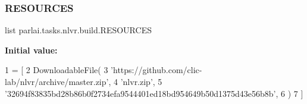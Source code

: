 \subsubsection{\texorpdfstring{R\+E\+S\+O\+U\+R\+C\+ES}{RESOURCES}}
{\footnotesize\ttfamily list parlai.\+tasks.\+nlvr.\+build.\+R\+E\+S\+O\+U\+R\+C\+ES}

{\bfseries Initial value\+:}
\begin{DoxyCode}
1 =  [
2     DownloadableFile(
3         \textcolor{stringliteral}{'https://github.com/clic-lab/nlvr/archive/master.zip'},
4         \textcolor{stringliteral}{'nlvr.zip'},
5         \textcolor{stringliteral}{'32694f83835bd28b86b0f2734efa9544401ed18bd954649b50d1375d43e56b8b'},
6     )
7 ]
\end{DoxyCode}
